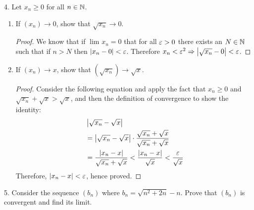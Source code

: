 4. Let $x_n \ge 0$ for all $n \in \mathbb{N}$.
\begin{enumerate}
	\item If  $\left( x_n \right) \to 0$, show that $\sqrt{x_n}  \to 0$.
	\begin{proof}
		We know that if $\lim_{} x_n = 0$ that for all $\e > 0$ there exists an $N \in \mathbb{N}$ such that if $n > N$ then $\left|x_n - 0\right| < \e$. Therefore $x_n < \e^{2} \implies \left|\sqrt{x_n} - 0 \right| < \e$.  
	\end{proof}


	\item If $\left( x_n \right) \to x$, show that $\left( \sqrt{x_n}  \right) \to \sqrt{x} $.

	\begin{proof}
		Consider the following equation and apply the fact that $x_n \ge 0$ and $\sqrt{x_n} + \sqrt{x} > \sqrt{x} $, and then the definition of convergence to show the identity:
	\begin{align}
			&\left|\sqrt{x_n} - \sqrt{x} \right| \\
			&= \left|\sqrt{x_n} - \sqrt{x} \right| \cdot \frac{\sqrt{x_n} + \sqrt{x}}{\sqrt{x_n} + \sqrt{x} }\\ 
			&= \frac{\left|x_n - x\right|}{\sqrt{x_n} + \sqrt{x}} < \frac{\left|x_n - x\right|}{\sqrt{x}} < \frac{\e}{\sqrt{x} }
		\end{align}
		Therefore, $\left|x_n - x\right| < \e$, hence proved.
	\end{proof}
\end{enumerate}

5. Consider the sequence $\left( b_n \right) $ where $b_n = \sqrt{n^{2} + 2n} - n$. Prove that $\left( b_n \right) $ is convergent and find its limit.

